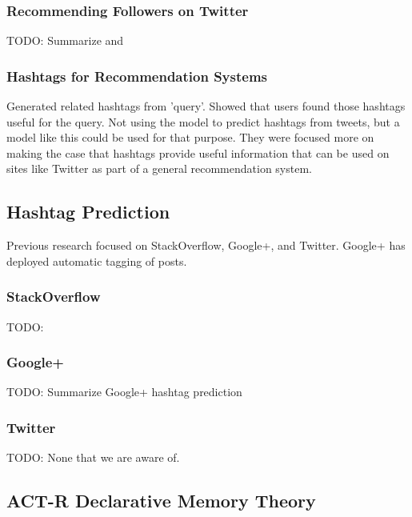 \documentclass[man]{apa6}
\begin{document}
\subsubsection{Recommending Followers on Twitter}

TODO: Summarize and \cite{Hannon2010}

\subsubsection{Hashtags for Recommendation Systems}

\cite{Efron2010} Generated related hashtags from 'query'.
Showed that users found those hashtags useful for the query.
Not using the model to predict hashtags from tweets, but a model like this could be used for that purpose.
They were focused more on making the case that hashtags provide useful information that can be used on sites like Twitter as part of a general recommendation system.

\subsection{Hashtag Prediction}

Previous research focused on StackOverflow, Google+, and Twitter.
Google+ has deployed automatic tagging of posts.

\subsubsection{StackOverflow}

TODO: \cite{Kuo2011}

\subsubsection{Google+}

TODO: Summarize Google+ hashtag prediction \cite{GoogleKeynote2013}

\subsubsection{Twitter}

TODO: None that we are aware of.

\subsection{ACT-R Declarative Memory Theory}

\cite{Anderson2004}
\end{document}
